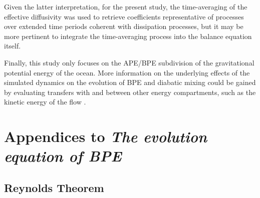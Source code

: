 
\color{red}Given the latter interpretation, for\color{black} the present study, the time-averaging of the effective diffusivity was used to retrieve coefficients representative of processes over extended time periods coherent with dissipation processes, but it may be more pertinent to integrate the time-averaging process into the balance equation itself.

Finally, this study only focuses on the APE/BPE subdivision of the gravitational potential energy of the ocean. More information on the underlying effects of the simulated dynamics on the evolution of BPE and diabatic mixing could be gained by evaluating transfers with and between other energy compartments, such as the kinetic energy of the flow \citep{floor_energy_2011}.


\section{Appendices to \textit{The evolution equation of BPE}}
\label{annexe_chapBPE}
\subsection{Reynolds Theorem}
\label{annexe_reynolds}
